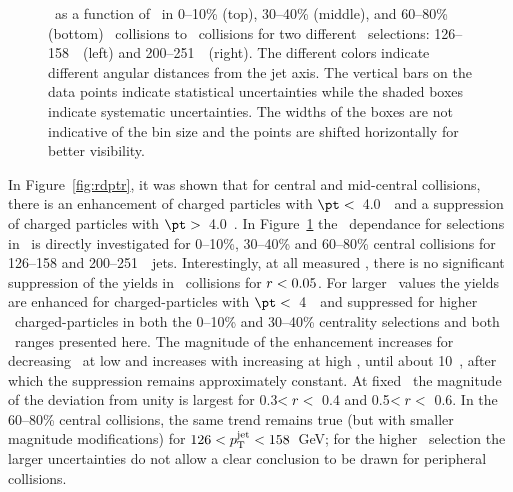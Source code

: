 \begin{figure}
   \caption{\RDptr\ as a function of \pt\ in  0--10\% (top), 30--40\% (middle), and 60--80\% (bottom) \PbPb\ collisions to \pp\ collisions for two different \ptjet\ selections: 126--158~\GeV\ (left) and 200--251~\GeV\ (right). The different colors indicate different angular distances from the jet axis. The vertical bars on the data points indicate statistical uncertainties while the shaded boxes indicate systematic uncertainties. The widths of the boxes are not indicative of the bin size and the points are shifted horizontally for better visibility.}
      \label{fig:pttrkdep}
\end{figure}


In Figure~\ref{fig:rdptr}, it was shown that for central and mid-central collisions, there is an enhancement of
charged particles with $\pt <$~4.0~\GeV\ and a suppression of charged particles with $\pt >$~4.0~\GeV.  In
Figure~\ref{fig:pttrkdep} 
the \pt\ dependance for selections in \rvar\ is directly investigated for 0--10\%, 30--40\% and 60--80\% central 
collisions for 126--158 and 200--251~\GeV\ jets.
Interestingly, at all measured \pt, there is no significant suppression of the yields in \pbpb\ collisions
for $\mbox{$r$} < 0.05$.  For larger \rvar\ values the yields are enhanced for charged-particles with $\pt <$~4~\GeV\ and 
suppressed for higher \pt\ charged-particles in both the 0--10\% and 30--40\% centrality selections and both \ptjet\ 
ranges presented here.  The magnitude of the enhancement increases for decreasing \pt\ at low \pt and increases
with increasing \pt at high \pt, until about 10~\GeV, after which the suppression remains approximately constant.
At fixed \pt\ the magnitude of the deviation from unity is largest for 0.3$< \mbox{$r$} <$~0.4 and 0.5$< \mbox{$r$} <$~0.6.
In the 60--80\% central collisions, the same trend remains true (but with smaller magnitude 
modifications) for \mbox{$126 < \mbox{$p_{\mathrm{T}}^{\mathrm{jet}}$} < 158$ GeV}; for the higher \ptjet\ selection the larger uncertainties 
do not allow a clear conclusion to be drawn for peripheral collisions.

